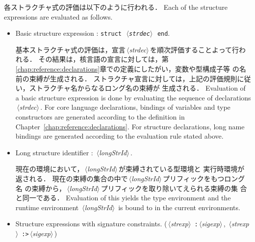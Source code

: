 \documentclass{jbook}
\newcommand{\txt}[2]{#2}
\newcommand{\code}[1]{\mbox{\large\tt #1}}
\newcommand{\nonterm}[1]{\mbox{$\,\langle$}{\it #1}\mbox{$\rangle\,$}}
\newcommand{\term}[1]{\mbox{{\tt #1}}}
\begin{document}
\ifjp%
	各ストラクチャ式の評価は以下のように行われる．
\else%
	Each of the structure expressions are evaluated as follows.
\fi%
\begin{itemize}
\item \txt{基本ストラクチャ式}{Basic structure expression} : \code{\term{struct}\ \nonterm{strdec}\ \term{end}}.

\ifjp%
	基本ストラクチャ式の評価は，宣言\nonterm{strdec}を順次評価することよって行われる．
	その結果は，核言語の宣言に対しては，第
\ref{chap:reference:declarations}章での定義にしたがい，変数や型構成子等
の名前の束縛が生成される．
	ストラクチャ宣言に対しては，上記の評価規則に従い，ストラクチャ名からなるロング名の束縛が
生成される．
\else%
	Evaluation of a basic structure expression is done by evaluating
the sequence of declarations \nonterm{strdec}.
	For core language declarations, bindings of variables and type
constructors are generated according to the definition in
Chapter~\ref{chap:reference:declarations}.
	For structure declarations, long name bindings are generated
according to the evaluation rule stated above.
\fi%

\item \txt{ロングストラクチャ名}{Long structure identifier} : \nonterm{longStrId}.

\ifjp%
	現在の環境において，\nonterm{longStrId}が束縛されている型環境と
実行時環境が返される．
	現在の束縛の集合の中で\nonterm{longStrId}プリフィックをもつロング名
の束縛から，\nonterm{longStrId}プリフィックを取り除いてえられる束縛の集
合と同一である．
\else%
	Evaluation of this yields the type environment and the runtime
environment \nonterm{longStrId} is bound to in the current environments.
\fi%

\item 
\txt{シグネチャ制約付きストラクチャ式}
{Structure expressions with signature constraints}.
(\nonterm{strexp} \term{:}\nonterm{sigexp}, \nonterm{strexp} \term{:>}\nonterm{sigexp})


\end{itemize}
\end{document}
